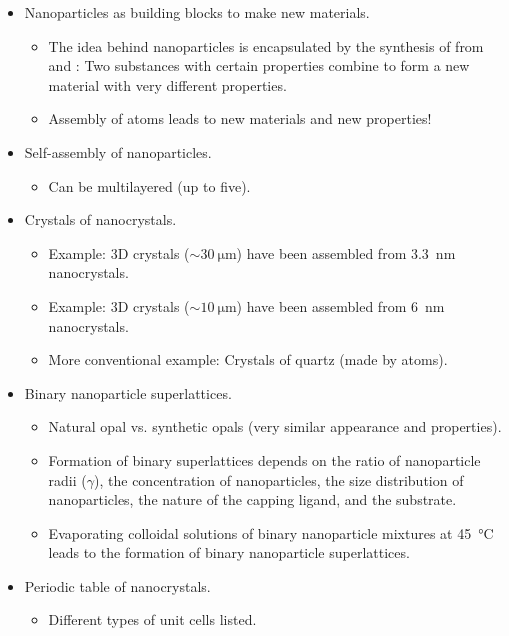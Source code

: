 \documentclass[../notes.tex]{subfiles}
\begin{document}
\begin{itemize}
\begin{itemize}
    \end{itemize}
    \item Nanoparticles as building blocks to make new materials.
    \begin{itemize}
        \item The idea behind nanoparticles is encapsulated by the synthesis of  from  and : Two substances with certain properties combine to form a new material with very different properties.
        \item Assembly of atoms leads to new materials and new properties!
    \end{itemize}
    \item Self-assembly of nanoparticles.
    \begin{itemize}
        \item Can be multilayered (up to five).
    \end{itemize}
    \item Crystals of nanocrystals.
    \begin{itemize}
        \item Example: 3D crystals ($\sim\SI{30}{\micro\meter}$) have been assembled from \SI{3.3}{\nano\meter}  nanocrystals.
        \item Example: 3D crystals ($\sim\SI{10}{\micro\meter}$) have been assembled from \SI{6}{\nano\meter}  nanocrystals.
        \item More conventional example: Crystals of quartz (made by atoms).
    \end{itemize}
    \item Binary nanoparticle superlattices.
    \begin{itemize}
        \item Natural opal vs. synthetic opals (very similar appearance and properties).
        \item Formation of binary superlattices depends on the ratio of nanoparticle radii ($\gamma$), the concentration of nanoparticles, the size distribution of nanoparticles, the nature of the capping ligand, and the substrate.
        \item Evaporating colloidal solutions of binary nanoparticle mixtures at \SI{45}{\celsius} leads to the formation of binary nanoparticle superlattices.
    \end{itemize}
    \item Periodic table of nanocrystals.
    \begin{itemize}
        \item Different types of unit cells listed.

\end{itemize}
\end{itemize}
\end{document}
